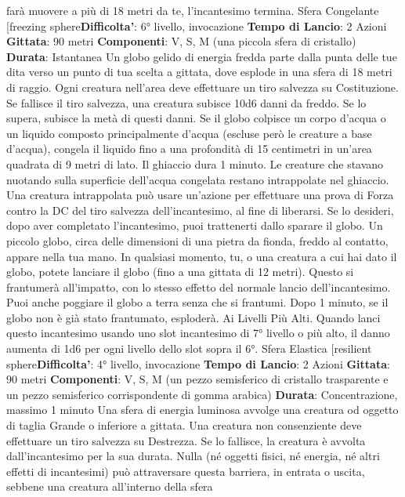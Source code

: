 \begin{multicols}{2}
farà muovere a più di 18 metri da te, l’incantesimo
termina.
Sfera Congelante
[freezing sphere\textbf{Difficolta'}:
6° livello, invocazione
\textbf{Tempo di Lancio}: 2 Azioni
\textbf{Gittata}: 90 metri
\textbf{Componenti}: V, S, M (una piccola sfera di cristallo)
\textbf{Durata}: Istantanea
Un globo gelido di energia fredda parte dalla punta
delle tue dita verso un punto di tua scelta a gittata, dove
esplode in una sfera di 18 metri di raggio. Ogni creatura
nell’area deve effettuare un tiro salvezza su
Costituzione. Se fallisce il tiro salvezza, una creatura
subisce 10d6 danni da freddo. Se lo supera, subisce la
metà di questi danni.
Se il globo colpisce un corpo d’acqua o un liquido
composto principalmente d’acqua (escluse però le
creature a base d’acqua), congela il liquido fino a una
profondità di 15 centimetri in un’area quadrata di 9 metri
di lato. Il ghiaccio dura 1 minuto. Le creature che
stavano nuotando sulla superficie dell’acqua congelata
restano intrappolate nel ghiaccio. Una creatura
intrappolata può usare un’azione per effettuare una
prova di Forza contro la DC del tiro salvezza
dell’incantesimo, al fine di liberarsi.
Se lo desideri, dopo aver completato l’incantesimo, puoi
trattenerti dallo sparare il globo. Un piccolo globo, circa
delle dimensioni di una pietra da fionda, freddo al
contatto, appare nella tua mano. In qualsiasi momento,
tu, o una creatura a cui hai dato il globo, potete lanciare
il globo (fino a una gittata di 12 metri). Questo si
frantumerà all’impatto, con lo stesso effetto del normale
lancio dell’incantesimo. Puoi anche poggiare il globo a
terra senza che si frantumi. Dopo 1 minuto, se il globo
non è già stato frantumato, esploderà.
Ai Livelli Più Alti. Quando lanci questo incantesimo
usando uno slot incantesimo di 7° livello o più alto, il
danno aumenta di 1d6 per ogni livello dello slot sopra il
6°.
Sfera Elastica
[resilient sphere\textbf{Difficolta'}:
4° livello, invocazione
\textbf{Tempo di Lancio}: 2 Azioni
\textbf{Gittata}: 90 metri
\textbf{Componenti}: V, S, M (un pezzo semisferico di cristallo
trasparente e un pezzo semisferico corrispondente di
gomma arabica)
\textbf{Durata}: Concentrazione, massimo 1 minuto
Una sfera di energia luminosa avvolge una creatura od
oggetto di taglia Grande o inferiore a gittata. Una
creatura non consenziente deve effettuare un tiro 
salvezza su Destrezza. Se lo fallisce, la creatura è
avvolta dall’incantesimo per la sua durata.
Nulla (né oggetti fisici, né energia, né altri effetti di
incantesimi) può attraversare questa barriera, in entrata
o uscita, sebbene una creatura all’interno della sfera

\end{multicols}
